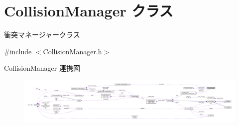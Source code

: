 \hypertarget{class_collision_manager}{}\section{Collision\+Manager クラス}
\label{class_collision_manager}


衝突マネージャークラス  




{\ttfamily \#include $<$Collision\+Manager.\+h$>$}



Collision\+Manager 連携図\nopagebreak
\begin{figure}[H]
\begin{center}
\leavevmode
\includegraphics[width=350pt]{class_collision_manager__coll__graph}
\end{center}
\end{figure}
